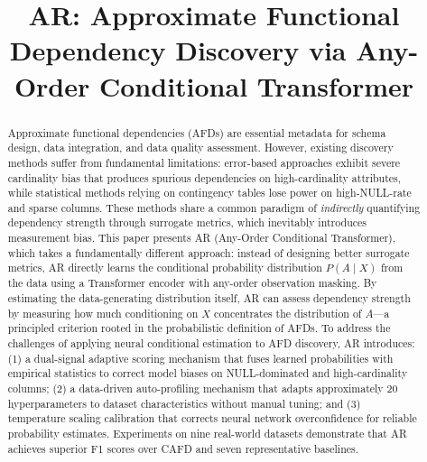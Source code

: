 \documentclass[conference]{IEEEtran}
\begin{document}
\title{AR: Approximate Functional Dependency Discovery via Any-Order Conditional Transformer}

\author{
}

\maketitle

\begin{abstract}
Approximate functional dependencies (AFDs) are essential metadata for schema design, data integration, and data quality assessment. However, existing discovery methods suffer from fundamental limitations: error-based approaches exhibit severe cardinality bias that produces spurious dependencies on high-cardinality attributes, while statistical methods relying on contingency tables lose power on high-NULL-rate and sparse columns. These methods share a common paradigm of \emph{indirectly} quantifying dependency strength through surrogate metrics, which inevitably introduces measurement bias. This paper presents AR (Any-Order Conditional Transformer), which takes a fundamentally different approach: instead of designing better surrogate metrics, AR directly learns the conditional probability distribution $P(A \mid X)$ from the data using a Transformer encoder with any-order observation masking. By estimating the data-generating distribution itself, AR can assess dependency strength by measuring how much conditioning on $X$ concentrates the distribution of $A$---a principled criterion rooted in the probabilistic definition of AFDs. To address the challenges of applying neural conditional estimation to AFD discovery, AR introduces: (1) a dual-signal adaptive scoring mechanism that fuses learned probabilities with empirical statistics to correct model biases on NULL-dominated and high-cardinality columns; (2) a data-driven auto-profiling mechanism that adapts approximately 20 hyperparameters to dataset characteristics without manual tuning; and (3) temperature scaling calibration that corrects neural network overconfidence for reliable probability estimates. Experiments on nine real-world datasets demonstrate that AR achieves superior F1 scores over CAFD and seven representative baselines.
\end{abstract}
\end{document}
